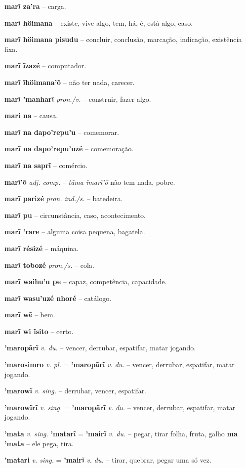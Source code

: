 \textbf{marĩ za'ra} -- carga.

\textbf{marĩ höimana} -- existe, vive algo, tem, há, é, está algo, caso.

\textbf{marĩ höimana pisudu} -- concluir, conclusão, marcação, indicação, existência fixa.

\textbf{marĩ ĩzazé} -- computador.

\textbf{marĩ ĩhöimana'õ} -- não ter nada, carecer.

\textbf{marĩ 'manharĩ} \textit{pron./v.} -- construir, fazer algo.

\textbf{mari na} -- causa.

\textbf{marĩ na dapo'repu'u} -- comemorar.

\textbf{marĩ na dapo'repu'uzé} -- comemoração.

\textbf{marĩ na saprĩ} -- comércio.

\textbf{marĩ'õ} \textit{adj. comp.} -- \textit{tãma ĩmarĩ'õ} não tem nada, pobre.

\textbf{marĩ parizé} \textit{pron. ind./s.} -- batedeira.

\textbf{marĩ pu} -- circunstância, caso, acontecimento.

\textbf{marĩ 'rare} -- alguma coisa pequena, bagatela.

\textbf{marĩ résizé} -- máquina.

\textbf{marĩ tobozé} \textit{pron./s.} -- cola.

\textbf{marĩ waihu'u pe} -- capaz, competência, capacidade.

\textbf{marĩ wasu'uzé nhoré} -- catálogo.

\textbf{marĩ wẽ} -- bem.

\textbf{marĩ wi ĩsito} -- certo.

\textbf{'maropãrĩ} \textit{v. du.} -- vencer, derrubar, espatifar, matar jogando.

\textbf{'marosimro} \textit{v. pl.} = \textbf{'maropãrĩ} \textit{v. du.} -- vencer, derrubar, espatifar, matar jogando.

\textbf{'marowĩ} \textit{v. sing.} -- derrubar, vencer, espatifar.

\textbf{'marowĩrĩ} \textit{v. sing.} = \textbf{'maropãrĩ} \textit{v. du.} -- vencer, derrubar, espatifar, matar jogando.

\textbf{'mata} \textit{v. sing.} \textbf{'matarĩ} = \textbf{'mairĩ} \textit{v. du.} -- pegar, tirar folha, fruta, galho  \textbf{ma 'mata} -- ele pega, tira.

\textbf{'matari} \textit{v. sing.} = \textbf{'mairĩ} \textit{v. du.} -- tirar, quebrar, pegar uma só vez.

